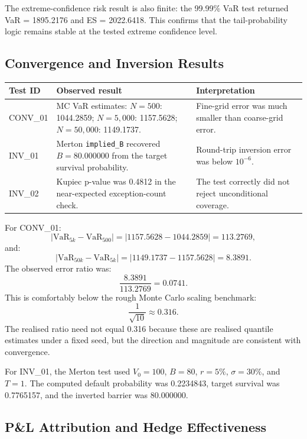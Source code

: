 \documentclass[11pt]{article}
\newcommand{\code}[1]{\texttt{#1}}
\begin{document}
The extreme-confidence risk result is also finite: the 99.99\% VaR test
returned VaR = 1895.2176 and ES = 2022.6418.  This confirms that the
tail-probability logic remains stable at the tested extreme confidence
level.

\subsection{Convergence and Inversion Results}

\begin{center}
\small
\begin{tabular}{L{2cm}L{4.5cm}L{6.5cm}}
\toprule
\textbf{Test ID} & \textbf{Observed result} & \textbf{Interpretation} \\
\midrule
CONV\_01 & MC VaR estimates: $N=500$: 1044.2859; $N=5{,}000$: 1157.5628; $N=50{,}000$: 1149.1737. & Fine-grid error was much smaller than coarse-grid error. \\
INV\_01 & Merton \code{implied\_B} recovered $B=80.000000$ from the target survival probability. & Round-trip inversion error was below $10^{-6}$. \\
INV\_02 & Kupiec p-value was 0.4812 in the near-expected exception-count check. & The test correctly did not reject unconditional coverage. \\
\bottomrule
\end{tabular}
\end{center}

For CONV\_01:
\[
  |\mathrm{VaR}_{5k} - \mathrm{VaR}_{500}|
  =
  |1157.5628 - 1044.2859|
  =
  113.2769,
\]
and:
\[
  |\mathrm{VaR}_{50k} - \mathrm{VaR}_{5k}|
  =
  |1149.1737 - 1157.5628|
  =
  8.3891.
\]
The observed error ratio was:
\[
  \frac{8.3891}{113.2769} = 0.0741.
\]
This is comfortably below the rough Monte Carlo scaling benchmark:
\[
  \frac{1}{\sqrt{10}} \approx 0.316.
\]
The realised ratio need not equal 0.316 because these are realised
quantile estimates under a fixed seed, but the direction and magnitude
are consistent with convergence.

For INV\_01, the Merton test used $V_0=100$, $B=80$, $r=5\%$,
$\sigma=30\%$, and $T=1$.  The computed default probability was
0.2234843, target survival was 0.7765157, and the inverted barrier was
80.000000.

\subsection{P\&L Attribution and Hedge Effectiveness}
\end{document}
